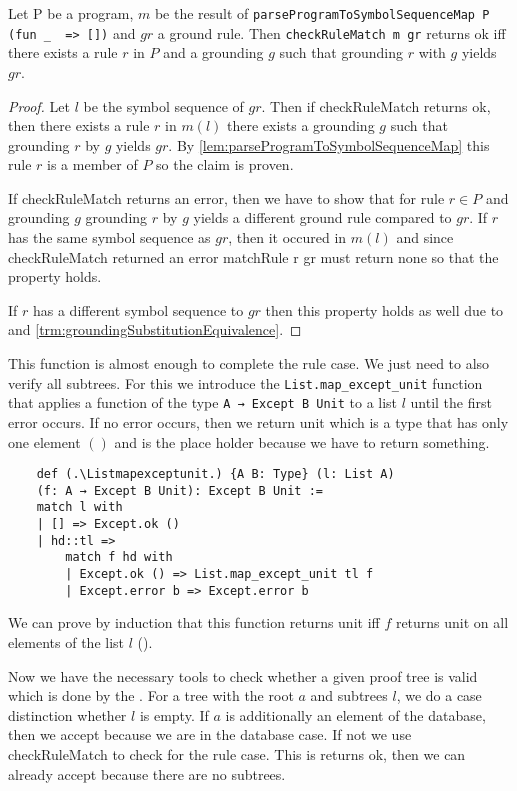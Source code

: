 \begin{lemma}[\checkRuleMatchOkIffExistsRuleForGroundRule]
    Let P be a program, $m$ be the result of \lstinline|parseProgramToSymbolSequenceMap P (fun _  => [])| and $gr$ a ground rule. Then \lstinline|checkRuleMatch m gr| returns ok iff there exists a rule $r$ in $P$ and a grounding $g$ such that grounding $r$ with $g$ yields $gr$.
\end{lemma}
\begin{proof}
    Let $l$ be the symbol sequence of $gr$. Then if checkRuleMatch returns ok, then there exists a rule $r$ in $m(l)$ there exists a grounding $g$ such that grounding $r$ by $g$ yields $gr$. By \cref{lem:parseProgramToSymbolSequenceMap} this rule $r$ is a member of $P$ so the claim is proven.

    If checkRuleMatch returns an error, then we have to show that for rule $r \in P$ and grounding $g$ grounding $r$ by $g$ yields a different ground rule compared to $gr$. If $r$ has the same symbol sequence as $gr$, then it occured in $m(l)$ and since checkRuleMatch returned an error matchRule r gr must return none so that the property holds.

    If $r$ has a different symbol sequence to $gr$ then this property holds as well due to \symbolSequenceNotEq and \cref{trm:groundingSubstitutionEquivalence}.
\end{proof}

This function is almost enough to complete the rule case. We just need to also verify all subtrees. For this we introduce the \lstinline|List.map_except_unit| function that applies a function of the type \lstinline|A → Except B Unit| to a list $l$ until the first error occurs. If no error occurs, then we return unit which is a type that has only one element $()$ and is the place holder because we have to return something.

\begin{lstlisting}
    def (.\Listmapexceptunit.) {A B: Type} (l: List A) 
    (f: A → Except B Unit): Except B Unit :=
    match l with
    | [] => Except.ok ()
    | hd::tl =>
        match f hd with
        | Except.ok () => List.map_except_unit tl f
        | Except.error b => Except.error b
\end{lstlisting}

We can prove by induction that this function returns unit iff $f$ returns unit on all elements of the list $l$ (\ListmapexceptunitIsUnitIffAll).

Now we have the necessary tools to check whether a given proof tree is valid which is done by the \treeValidator. For a tree with the root $a$ and subtrees $l$, we do a case distinction whether $l$ is empty. If $a$ is additionally an element of the database, then we accept because we are in the database case. If not we use checkRuleMatch to check for the rule case. This is returns ok, then we can already accept because there are no subtrees.

